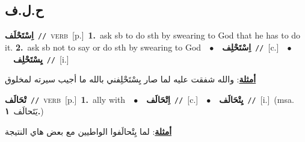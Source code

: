 \documentclass[10pt,a4paper,twoside]{article} %
\begin{document}
\begin{multicols}{2}
\vspace{-3mm}
\subsection*{\color{blue}\foreignlanguage{arabic}{ح.ل.ف}\color{blue}{}} 

{\setlength\topsep{0pt}\textbf{\foreignlanguage{arabic}{اِسْتَحْلَف}}\ {\color{gray}\texttt{//}\color{black}}\ \textsc{verb}\ [p.]\ \textbf{1.}~ask sb to do sth by swearing to God that he has to do it.  \textbf{2.}~ask sb not to say or do sth by swearing to God\ \ $\bullet$\ \ \setlength\topsep{0pt}\textbf{\foreignlanguage{arabic}{اِسْتَحْلِف}}\ {\color{gray}\texttt{//}\color{black}}\ [c.]\ \ $\bullet$\ \ \setlength\topsep{0pt}\textbf{\foreignlanguage{arabic}{يِسْتَحْلِف}}\ {\color{gray}\texttt{//}\color{black}}\ [i.]\  \begin{flushright}\color{gray}\foreignlanguage{arabic}{\textbf{\underline{\foreignlanguage{arabic}{أمثلة}}}: والله شفقت عليه لما صار يِسْتَحْلِفني بالله ما أجيب سيرته لمخلوق}\end{flushright}\color{black}} \vspace{2mm}

{\setlength\topsep{0pt}\textbf{\foreignlanguage{arabic}{تْحَالَف}}\ {\color{gray}\texttt{//}\color{black}}\ \textsc{verb}\ [p.]\ \textbf{1.}~ally with\ \ $\bullet$\ \ \setlength\topsep{0pt}\textbf{\foreignlanguage{arabic}{اِتْحَالَف}}\ {\color{gray}\texttt{//}\color{black}}\ [c.]\ \ $\bullet$\ \ \setlength\topsep{0pt}\textbf{\foreignlanguage{arabic}{يِتْحَالَف}}\ {\color{gray}\texttt{//}\color{black}}\ [i.]\ \color{gray}(msa. \foreignlanguage{arabic}{يَتَحالَف}~\foreignlanguage{arabic}{\textbf{١.}})\color{black}\  \begin{flushright}\color{gray}\foreignlanguage{arabic}{\textbf{\underline{\foreignlanguage{arabic}{أمثلة}}}: لما يِتْحالَفوا الواطيين مع بعض هاي النتيجة}\end{flushright}\color{black}} \vspace{2mm}


\end{multicols}
\end{document}
